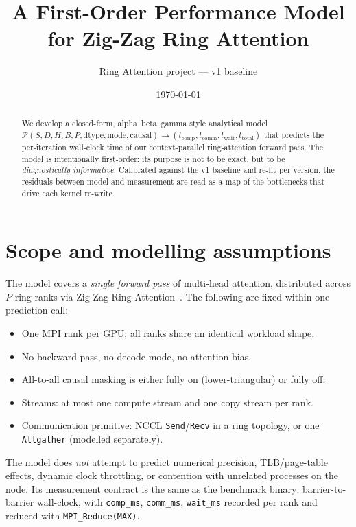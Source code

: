 \documentclass[11pt]{article}
\title{A First-Order Performance Model for Zig-Zag Ring Attention}
\author{Ring Attention project --- v1 baseline}
\date{\today}
\newcommand{\comp}{\mathrm{comp}}
\newcommand{\comm}{\mathrm{comm}}
\newcommand{\wait}{\mathrm{wait}}
\newcommand{\tot}{\mathrm{total}}
\newcommand{\dtype}{\mathrm{dtype}}
\begin{document}
\maketitle

\begin{abstract}
We develop a closed-form, alpha--beta--gamma style analytical model
$\mathcal{P}(S, D, H, B, P, \dtype, \text{mode}, \text{causal}) \to (t_\comp, t_\comm, t_\wait, t_\tot)$
that predicts the per-iteration wall-clock time of our context-parallel
ring-attention forward pass. The model is intentionally first-order:
its purpose is not to be exact, but to be \emph{diagnostically informative}.
Calibrated against the v1 baseline and re-fit per version, the residuals
between model and measurement are read as a map of the bottlenecks
that drive each kernel re-write.
\end{abstract}

\tableofcontents

\bigskip

\section{Scope and modelling assumptions}
\label{sec:scope}

The model covers a \emph{single forward pass} of multi-head attention,
distributed across $P$ ring ranks via Zig-Zag Ring
Attention~\cite{liu2023ring,brandon2023ringflash}. The following are
fixed within one prediction call:

\begin{itemize}
  \item One MPI rank per GPU; all ranks share an identical workload shape.
  \item No backward pass, no decode mode, no attention bias.
  \item All-to-all causal masking is either fully on (lower-triangular)
        or fully off.
  \item Streams: at most one compute stream and one copy stream per rank.
  \item Communication primitive: NCCL \texttt{Send}/\texttt{Recv}
        in a ring topology, or one \texttt{Allgather} (modelled separately).
\end{itemize}

The model does \emph{not} attempt to predict numerical precision,
TLB/page-table effects, dynamic clock throttling, or contention with
unrelated processes on the node. Its measurement contract is the same
as the benchmark binary: barrier-to-barrier wall-clock, with
\texttt{comp\_ms}, \texttt{comm\_ms}, \texttt{wait\_ms} recorded
per rank and reduced with \texttt{MPI\_Reduce(MAX)}.
\end{document}
